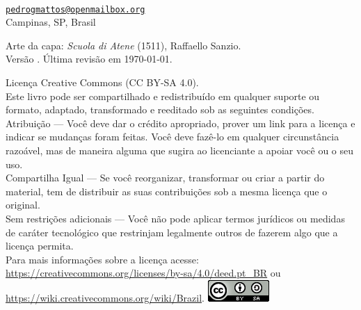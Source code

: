 \thispagestyle{empty}

\noindent
\autor \\
\href{mailto:pedrogmattos@openmailbox.org}{\texttt{pedrogmattos@openmailbox.org}}\\
Campinas, SP, Brasil

\vfill

\noindent Arte da capa: \textit{Scuola di Atene} (1511), Raffaello Sanzio.
\vspace*{0.5cm}\\
Versão \versao. Última revisão em \today.
\vspace*{0.5cm}\\
\begin{small}
\noindent
\ccLogo{} Licença Creative Commons (CC BY-SA 4.0).\\
Este livro pode ser compartilhado e redistribuído em qualquer suporte ou formato, adaptado, transformado e reeditado sob as seguintes condições.\\
Atribuição --- Você deve dar o crédito apropriado, prover um link para a licença e indicar se mudanças foram feitas. Você deve fazê-lo em qualquer circunstância razoável, mas de maneira alguma que sugira ao licenciante a apoiar você ou o seu uso.\\
Compartilha Igual --- Se você reorganizar, transformar ou criar a partir do material, tem de distribuir as suas contribuições sob a mesma licença que o original.\\
Sem restrições adicionais --- Você não pode aplicar termos jurídicos ou medidas de caráter tecnológico que restrinjam legalmente outros de fazerem algo que a licença permita.\\
Para mais informações sobre a licença acesse:\\
\url{https://creativecommons.org/licenses/by-sa/4.0/deed.pt_BR} ou\\
\url{https://wiki.creativecommons.org/wiki/Brazil}. \hfill
\includegraphics[height=\baselineskip]{./imagens/licensa.png}
\end{small}
